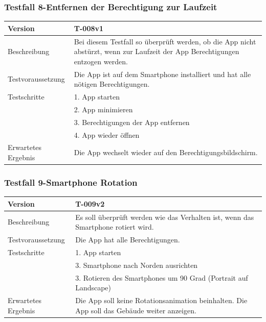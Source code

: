 \documentclass[a4paper]{scrreprt}
\begin{document}
\subsubsection{Testfall 8-Entfernen der Berechtigung zur Laufzeit}
\begin{tabularx}{\textwidth}{|l|X|}
\hline
	Version &
	T-008v1 \\ 
\hline 
	Beschreibung & 
	Bei diesem Testfall so überprüft werden, ob die App nicht abstürzt, wenn zur Laufzeit der App Berechtigungen entzogen werden. \\ 
\hline 
	Testvoraussetzung &
	Die App ist auf dem Smartphone installiert und hat alle nötigen Berechtigungen. \\ 
\hline 
	Testschritte & 
		1. App starten\\ &
		2. App minimieren\\ &
		3. Berechtigungen der App entfernen\\ &
		4. App wieder öffnen\\
\hline
	Erwartetes Ergebnis &
	Die App wechselt wieder auf den Berechtigungsbildschirm. \\
\hline
\end{tabularx}
\subsubsection{Testfall 9-Smartphone Rotation}
\begin{tabularx}{\textwidth}{|l|X|}
\hline
	Version &
	T-009v2 \\
\hline
	Beschreibung &
	Es soll überprüft werden wie das Verhalten ist, wenn das Smartphone rotiert wird. \\
\hline
	Testvoraussetzung &
	Die App hat alle Berechtigungen. \\ 
\hline 
	Testschritte & 
		1. App starten\\ &
		3. Smartphone nach Norden ausrichten\\ &
		3. Rotieren des Smartphones um 90 Grad (Portrait auf Landscape)\\
\hline
	Erwartetes Ergebnis &
	Die App soll keine Rotationsanimation beinhalten. Die App soll das Gebäude weiter anzeigen. \\
\hline
\end{tabularx}
\end{document}
